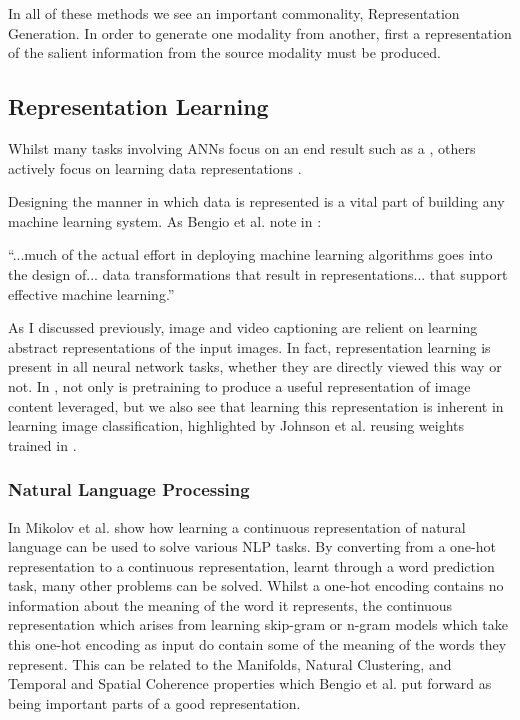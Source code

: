 In all of these methods we see an important commonality, Representation Generation. In order to generate one modality from another, first a representation of the salient information from the source modality must be produced.

\subsection{Representation Learning}

Whilst many tasks involving \ac{ANN}s focus on an end result such as a \cite{krizhevsky2012imagenet}, others actively focus on learning data representations \cite{radford2015unsupervised, silberer2014learning, wavenet, vincent2010stacked, mikolov2013distributed, mikolov2013efficient, mikolov2013linguistic, feng2010visual, eslami2018neural, donahue2019large}.

Designing the manner in which data is represented is a vital part of building any machine learning system. As Bengio et al. note in \cite{repRev}:

\begin{displayquote}
``...much of the actual effort in deploying machine learning algorithms goes into the design of... data transformations that result in representations... that support effective machine learning.''
\end{displayquote}

As I discussed previously, image and video captioning are relient on learning abstract representations of the input images. In fact, representation learning is present in all neural network tasks, whether they are directly viewed this way or not. In \cite{vinyals2015show, venugopalan2014translating, johnson2016densecap}, not only is pretraining to produce a useful representation of image content leveraged, but we also see that learning this representation is inherent in learning image classification, highlighted by Johnson et al. \cite{johnson2016densecap} reusing weights trained in \cite{simonyan2014very}. 

\subsubsection{Natural Language Processing}
In \cite{mikolov2013distributed, mikolov2013efficient, mikolov2013linguistic} Mikolov et al. show how learning a continuous representation of natural language can be used to solve various \ac{NLP} tasks. By converting from a one-hot representation to a continuous representation, learnt through a word prediction task, many other problems can be solved. 
Whilst a one-hot encoding contains no information about the meaning of the word it represents, the continuous representation which arises from learning skip-gram or n-gram models which take this one-hot encoding as input do contain some of the meaning of the words they represent. This can be related to the Manifolds, Natural Clustering, and Temporal and Spatial Coherence properties which Bengio et al. \cite{repRev} put forward as being important parts of a good representation.

